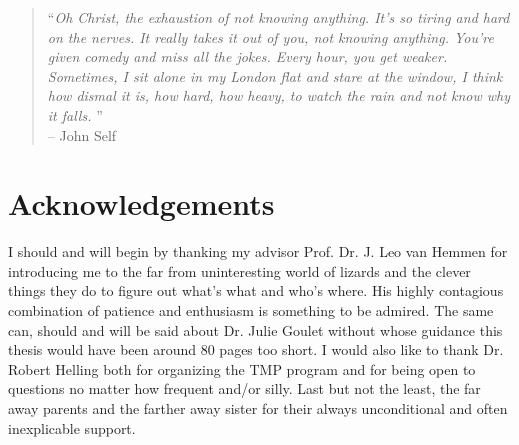 \vspace*{\fill}
\begin{quote}
\small
``\emph{Oh Christ, the exhaustion of not knowing anything. It’s so tiring and hard on the nerves. 
It really takes it out of you, not knowing anything. You’re given comedy and miss all the jokes. 
Every hour, you get weaker. Sometimes, I sit alone in my London flat and stare at the window, 
I think how dismal it is, how hard, how heavy, to watch the rain and not know why it falls. }''\\
\normalsize
\flushright -- John Self\\
\end{quote}

\vspace*{\fill}


\chapter*{Acknowledgements}
I should and will begin by thanking my advisor Prof. Dr. J. Leo van Hemmen
for introducing me to the far from uninteresting world of lizards and
the clever things they do to figure out what's what and who's where. His 
highly contagious combination
of patience and enthusiasm is something to be admired. The same can, should and will be said
about Dr. Julie Goulet without whose guidance this thesis would have been around 80
pages too short.
I would also like to thank Dr. Robert Helling both for organizing the TMP program
and for being open to questions no matter how frequent and/or silly.
Last but not the least, the far away parents and the farther away sister for their always unconditional and often
inexplicable support.